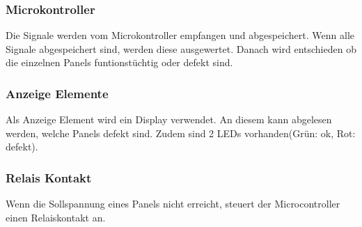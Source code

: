 \subsubsection{Microkontroller}
Die Signale werden vom Microkontroller empfangen und abgespeichert. Wenn alle Signale abgespeichert sind, werden diese ausgewertet. Danach wird entschieden ob die einzelnen Panels funtionstüchtig oder defekt sind.

\subsubsection{Anzeige Elemente}
Als Anzeige Element wird ein Display verwendet. An diesem kann abgelesen werden, welche Panels defekt sind. Zudem sind 2 LEDs vorhanden(Grün: ok, Rot: defekt).

\subsubsection{Relais Kontakt}
Wenn die Sollspannung eines Panels nicht erreicht, steuert der Microcontroller einen Relaiskontakt an. 

%
